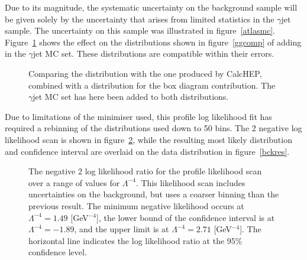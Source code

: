 Due to its magnitude, the systematic uncertainty on the background sample will be given solely by the uncertainty that arises from limited statistics in the \atlas{} $\gamma$jet sample. The uncertainty on this sample was illustrated in figure~\ref{atlasmc}. Figure~\ref{mccompjet} shows the effect on the distributions shown in figure~\ref{ggcomp} of adding in the $\gamma$jet MC set. These distributions are compatible within their errors.


\begin{figure}[htp]
\begin{minipage}[b]{.69\textwidth}
\begin{infilsf} \tiny

\end{infilsf}
\end{minipage}
\begin{minipage}[b]{.3\textwidth}
\caption{Comparing the \atlas{} distribution with the one produced by CalcHEP, combined with a distribution for the box diagram contribution. The \atlas{} $\gamma$jet MC set has here been added to both distributions.}\label{mccompjet}
\end{minipage}
\end{figure}

Due to limitations of the minimiser used, this profile log likelihood fit has required a rebinning of the distributions used down to 50 bins. The 2 negative log likelihood scan is shown in figure~\ref{bckllr}, while the resulting most likely distribution and confidence interval are overlaid on the data distribution in figure~\ref{bckres}.

\begin{figure}[htp]
\begin{minipage}[b]{.69\textwidth}
\begin{infilsf} \tiny

\end{infilsf}
\end{minipage}
\begin{minipage}[b]{.3\textwidth}
\caption{The negative 2 log likelihood ratio for the profile likelihood scan over a range of values for $\Lambda^{-4}$. This likelihood scan includes uncertainties on the background, but uses a coarser binning than the previous result. The minimum negative likelihood occurs at $\Lambda^{-4}=1.49$ [GeV$^{-4}$], the lower bound of the confidence interval is at $\Lambda^{-4}=-1.89$, and the upper limit is at $\Lambda^{-4}=2.71$ [GeV$^{-4}$]. The horizontal line indicates the log likelihood ratio at the 95\% confidence level.}\label{bckllr}
\end{minipage}
\end{figure}

